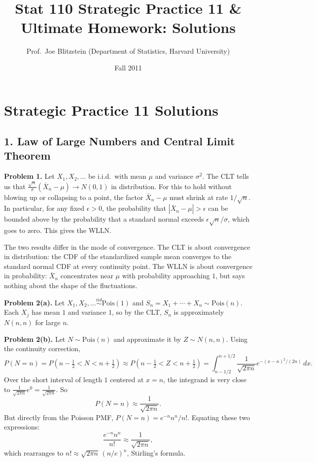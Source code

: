 \documentclass{article}
\title{Stat 110 Strategic Practice 11 \& Ultimate Homework: Solutions}
\author{Prof.\ Joe Blitzstein (Department of Statistics, Harvard University)}
\date{Fall 2011}
\begin{document}
\maketitle

\section*{Strategic Practice 11 Solutions}

\subsection*{1. Law of Large Numbers and Central Limit Theorem}

\textbf{Problem 1.} Let $X_1,X_2,\dots$ be i.i.d.\ with mean $\mu$ and variance $\sigma^2$. The CLT tells us that $\frac{\sqrt{n}}{\sigma}(\bar X_n-\mu)\to N(0,1)$ in distribution. For this to hold without blowing up or collapsing to a point, the factor $\bar X_n-\mu$ must shrink at rate $1/\sqrt{n}$. In particular, for any fixed $\epsilon>0$, the probability that $|\bar X_n-\mu|>\epsilon$ can be bounded above by the probability that a standard normal exceeds $\epsilon\sqrt{n}/\sigma$, which goes to zero. This gives the WLLN.

The two results differ in the mode of convergence. The CLT is about convergence in distribution: the CDF of the standardized sample mean converges to the standard normal CDF at every continuity point. The WLLN is about convergence in probability: $\bar X_n$ concentrates near $\mu$ with probability approaching $1$, but says nothing about the shape of the fluctuations.

\bigskip
\textbf{Problem 2(a).} Let $X_1,X_2,\dots\overset{iid}{\sim}\text{Pois}(1)$ and $S_n=X_1+\cdots+X_n\sim\text{Pois}(n)$. Each $X_j$ has mean $1$ and variance $1$, so by the CLT, $S_n$ is approximately $N(n,n)$ for large $n$.

\textbf{Problem 2(b).} Let $N\sim\text{Pois}(n)$ and approximate it by $Z\sim N(n,n)$. Using the continuity correction,
$$
P(N=n)=P\!\left(n-\tfrac12<N<n+\tfrac12\right)\approx P\!\left(n-\tfrac12<Z<n+\tfrac12\right)=\int_{n-1/2}^{n+1/2}\frac{1}{\sqrt{2\pi n}}e^{-(x-n)^2/(2n)}\,dx.
$$
Over the short interval of length $1$ centered at $x=n$, the integrand is very close to $\frac{1}{\sqrt{2\pi n}}e^0=\frac{1}{\sqrt{2\pi n}}$. So
$$
P(N=n)\approx\frac{1}{\sqrt{2\pi n}}.
$$
But directly from the Poisson PMF, $P(N=n)=e^{-n}n^n/n!$. Equating these two expressions:
$$
\frac{e^{-n}n^n}{n!}\approx\frac{1}{\sqrt{2\pi n}},
$$
which rearranges to $n!\approx\sqrt{2\pi n}\,(n/e)^n$, Stirling's formula.
\end{document}
